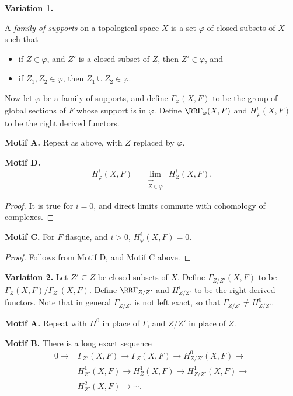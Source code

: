 \medskip\noindent\textbf{Variation 1.}
\begin{definition*}
A \emph{family of supports} on a topological space $X$ is a set $\varphi$ of closed subsets of $X$ such that
\begin{itemize}
\item[(a)] if $Z\in\varphi$, and $Z'$ is a closed subset of $Z$, then $Z'\in\varphi$, and
\item[(b)] if $Z_1,Z_2\in\varphi$, then $Z_1\cup Z_2\in\varphi$.
\end{itemize}
\end{definition*}

Now let $\varphi$ be a family of supports, and define $\Gamma_\varphi(X,F)$ to be the group of global sections of $F$ whose support is in $\varphi$. Define $\RR\Gamma_\varphi(X,F)$ and $H^i_\varphi(X,F)$ to be the right derived functors.

\medskip\noindent\textbf{Motif A.} Repeat as above, with $Z$ replaced by $\varphi$.

\medskip\noindent\textbf{Motif D.}
\[
H_{\varphi}^{i}(X,F)=\lim_{\substack{\longrightarrow \\ Z\in\varphi}}\,H_{Z}^{i}(X,F).
\]
\begin{proof}
It is true for $i=0$, and direct limits commute with cohomology of complexes.
\end{proof}

\medskip\noindent\textbf{Motif C.} For $F$ flasque, and $i>0$, $H_{\varphi}^{i}(X,F)=0$.
\begin{proof}
Follows from Motif D, and Motif C above.
\end{proof}

\medskip\noindent\textbf{Variation 2.}
Let $Z'\subseteq Z$ be closed subsets of $X$. Define $\Gamma_{Z/Z'}(X,F)$ to be $\Gamma_Z(X,F)/\Gamma_{Z'}(X,F)$. Define $\RR\Gamma_{Z/Z'}$ and $H^i_{Z/Z'}$ to be the right derived functors. Note that in general $\Gamma_{Z/Z'}$ is not left exact, so that $\Gamma_{Z/Z'}\neq H^0_{Z/Z'}$.

\medskip\noindent\textbf{Motif A.} Repeat with $H^0$ in place of $\Gamma$, and $Z/Z'$ in place of $Z$.

\medskip\noindent\textbf{Motif B.} There is a long exact sequence
\begin{align*}
0\longrightarrow &\Gamma_{Z'}(X,F)\longrightarrow \Gamma_Z(X,F)\longrightarrow H_{Z/Z'}^0(X,F)\longrightarrow\\
&H_{Z'}^1(X,F)\longrightarrow H_Z^1(X,F)\longrightarrow H_{Z/Z'}^1(X,F)\longrightarrow\\
&H_{Z'}^2(X,F)\longrightarrow\cdots.
\end{align*}


